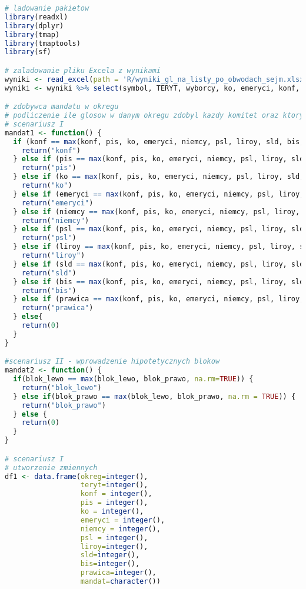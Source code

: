 \documentclass[12pt, a4paper, fleqn]{report}
\begin{document}
\begin{lstlisting}[language=R]
# ladowanie pakietow
library(readxl)
library(dplyr)
library(tmap)
library(tmaptools)
library(sf)

# zaladowanie pliku Excela z wynikami
wyniki <- read_excel(path = 'R/wyniki_gl_na_listy_po_obwodach_sejm.xlsx')
wyniki <- wyniki %>% select(symbol, TERYT, wyborcy, ko, emeryci, konf, psl, prawica, pis, liroy, sld, bis, niemcy)

# zdobywca mandatu w okregu
# podliczenie ile glosow w danym okregu zdobyl kazdy komitet oraz ktory mial ich najwiecej
# scenariusz I
mandat1 <- function() {
  if (konf == max(konf, pis, ko, emeryci, niemcy, psl, liroy, sld, bis, prawica, na.rm = TRUE)) {
    return("konf")
  } else if (pis == max(konf, pis, ko, emeryci, niemcy, psl, liroy, sld, bis, prawica, na.rm = TRUE)) {
    return("pis")
  } else if (ko == max(konf, pis, ko, emeryci, niemcy, psl, liroy, sld, bis, prawica, na.rm = TRUE)) {
    return("ko")
  } else if (emeryci == max(konf, pis, ko, emeryci, niemcy, psl, liroy, sld, bis, prawica, na.rm = TRUE)) {
    return("emeryci")
  } else if (niemcy == max(konf, pis, ko, emeryci, niemcy, psl, liroy, sld, bis, prawica, na.rm = TRUE)) {
    return("niemcy")
  } else if (psl == max(konf, pis, ko, emeryci, niemcy, psl, liroy, sld, bis, prawica, na.rm = TRUE)) {
    return("psl")
  } else if (liroy == max(konf, pis, ko, emeryci, niemcy, psl, liroy, sld, bis, prawica, na.rm = TRUE)) {
    return("liroy")
  } else if (sld == max(konf, pis, ko, emeryci, niemcy, psl, liroy, sld, bis, prawica, na.rm = TRUE)) {
    return("sld")
  } else if (bis == max(konf, pis, ko, emeryci, niemcy, psl, liroy, sld, bis, prawica, na.rm = TRUE)) {
    return("bis")
  } else if (prawica == max(konf, pis, ko, emeryci, niemcy, psl, liroy, sld, bis, prawica, na.rm = TRUE)) {
    return("prawica")
  } else{
    return(0)
  }
}

#scenariusz II - wprowadzenie hipotetycznych blokow
mandat2 <- function() {
  if(blok_lewo == max(blok_lewo, blok_prawo, na.rm=TRUE)) {
    return("blok_lewo")
  } else if(blok_prawo == max(blok_lewo, blok_prawo, na.rm = TRUE)) {
    return("blok_prawo")
  } else {
    return(0)
  }
}

# scenariusz I
# utworzenie zmiennych
df1 <- data.frame(okreg=integer(),
                  teryt=integer(),
                  konf = integer(),
                  pis = integer(),
                  ko = integer(),
                  emeryci = integer(),
                  niemcy = integer(),
                  psl = integer(),
                  liroy=integer(),
                  sld=integer(),
                  bis=integer(),
                  prawica=integer(),
                  mandat=character())


\end{lstlisting}
\end{document}
